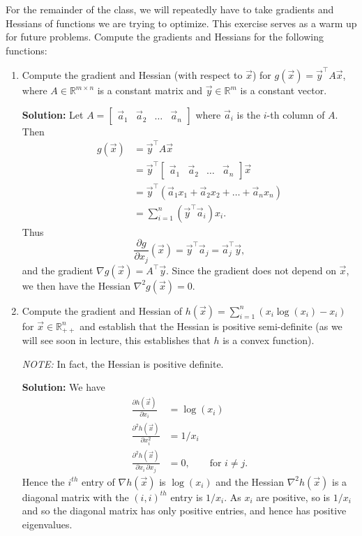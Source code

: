 \documentclass[10pt]{article}
\newcommand{\RR}{\mathbb{R}}
\begin{document}
For the remainder of the class, we will repeatedly have to take gradients and Hessians of functions we are trying to optimize. This exercise serves as a warm up for future problems. Compute the gradients and Hessians for the following functions:

\begin{enumerate}[label=(\alph*)]
\item Compute the gradient and Hessian (with respect to $\vec{x}$) for $g(\vec{x}) = \vec{y}^\top A \vec{x}$, where $A \in \RR^{m \times n}$ is a constant matrix and $\vec{y} \in \RR^m$ is a constant vector.

\textbf{Solution:} Let $A = \begin{bmatrix} \vec{a}_1 & \vec{a}_2 & \ldots & \vec{a}_n \end{bmatrix}$ where $\vec{a}_i$ is the $i$-th column of $A$. Then
\begin{align}
g(\vec{x}) &= \vec{y}^\top A \vec{x} \\
&= \vec{y}^\top \begin{bmatrix} \vec{a}_1 & \vec{a}_2 & \ldots & \vec{a}_n \end{bmatrix} \vec{x} \\
&= \vec{y}^\top (\vec{a}_1 x_1 + \vec{a}_2 x_2 + \ldots + \vec{a}_n x_n) \\
&= \sum_{i=1}^{n} (\vec{y}^\top \vec{a}_i) x_i.
\end{align}
Thus
\begin{equation}
\frac{\partial g}{\partial x_j}(\vec{x}) = \vec{y}^\top \vec{a}_j = \vec{a}_j^\top \vec{y},
\end{equation}
and the gradient $\nabla g(\vec{x}) = A^\top \vec{y}$. Since the gradient does not depend on $\vec{x}$, we then have the Hessian $\nabla^2 g(\vec{x}) = 0$.

\item Compute the gradient and Hessian of $h(\vec{x}) = \displaystyle\sum_{i=1}^{n} (x_i \log(x_i) - x_i)$ for $\vec{x} \in \RR^n_{++}$ and establish that the Hessian is positive semi-definite (as we will see soon in lecture, this establishes that $h$ is a convex function).

\emph{NOTE:} In fact, the Hessian is positive definite.

\textbf{Solution:} We have
\begin{align*}
\frac{\partial h(\vec{x})}{\partial x_i} &= \log(x_i) \\[4pt]
\frac{\partial^2 h(\vec{x})}{\partial x_i^2} &= 1/x_i \\[4pt]
\frac{\partial^2 h(\vec{x})}{\partial x_i \, \partial x_j} &= 0, \qquad \text{for } i \neq j.
\end{align*}
Hence the $i^{th}$ entry of $\nabla h(\vec{x})$ is $\log(x_i)$ and the Hessian $\nabla^2 h(\vec{x})$ is a diagonal matrix with the $(i,i)^{th}$ entry is $1/x_i$. As $x_i$ are positive, so is $1/x_i$ and so the diagonal matrix has only positive entries, and hence has positive eigenvalues.


\end{enumerate}
\end{document}
